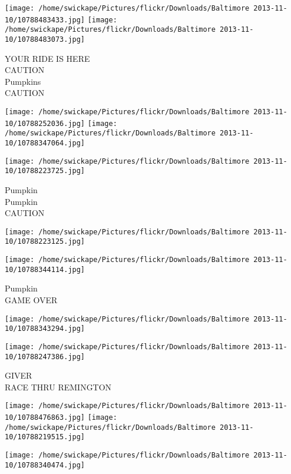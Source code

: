 \documentclass[10pt,letterpaper]{article}
\begin{document}
\texttt{[image: /home/swickape/Pictures/flickr/Downloads/Baltimore 2013-11-10/10788483433.jpg]}
\texttt{[image: /home/swickape/Pictures/flickr/Downloads/Baltimore 2013-11-10/10788483073.jpg]}

YOUR RIDE IS HERE\\
CAUTION\\
Pumpkins\\
CAUTION\\
\pagebreak

\texttt{[image: /home/swickape/Pictures/flickr/Downloads/Baltimore 2013-11-10/10788252036.jpg]}
\texttt{[image: /home/swickape/Pictures/flickr/Downloads/Baltimore 2013-11-10/10788347064.jpg]}

\vspace{0.25in}
\texttt{[image: /home/swickape/Pictures/flickr/Downloads/Baltimore 2013-11-10/10788223725.jpg]}

Pumpkin\\
Pumpkin\\
CAUTION\\
\pagebreak

\texttt{[image: /home/swickape/Pictures/flickr/Downloads/Baltimore 2013-11-10/10788223125.jpg]}

\vspace{0.25in}
\texttt{[image: /home/swickape/Pictures/flickr/Downloads/Baltimore 2013-11-10/10788344114.jpg]}

Pumpkin\\
GAME OVER\\
\pagebreak

\texttt{[image: /home/swickape/Pictures/flickr/Downloads/Baltimore 2013-11-10/10788343294.jpg]}

\vspace{0.25in}
\texttt{[image: /home/swickape/Pictures/flickr/Downloads/Baltimore 2013-11-10/10788247386.jpg]}

GIVER\\
RACE THRU REMINGTON\\
\pagebreak

\texttt{[image: /home/swickape/Pictures/flickr/Downloads/Baltimore 2013-11-10/10788476863.jpg]}
\texttt{[image: /home/swickape/Pictures/flickr/Downloads/Baltimore 2013-11-10/10788219515.jpg]}

\vspace{0.25in}
\texttt{[image: /home/swickape/Pictures/flickr/Downloads/Baltimore 2013-11-10/10788340474.jpg]}
\end{document}
